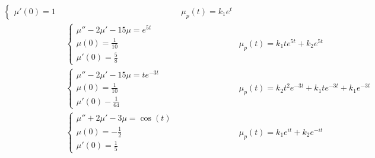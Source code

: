\begin{enumerate}
\begin{align*}
\begin{cases}
			      \mu ' \left(0\right) = 1
		      \end{cases}
		       &                                                     &
		      \mu_p \left(t\right) = k_1 e^{t}                                                                                                        \\
		       &
		      \begin{cases}
			      \mu '' - 2 \mu ' - 15 \mu = e^{5t } \\
			      \mu \left(0\right) = \frac{1}{10}   \\
			      \mu ' \left(0\right) = \frac{5}{8}
		      \end{cases}
		       &                                                     & \mu _p \left(t\right) = k_1 t e ^{5t } + k_2 e ^{ 5t }                         \\
		       &
		      \begin{cases}
			      \mu '' - 2 \mu ' - 15 \mu  = t e ^{ - 3t } \\
			      \mu \left(0\right) = \frac{1}{10}          \\
			      \mu ' \left(0\right) - \frac{1}{64}
		      \end{cases}
		       &                                                     & \mu_p \left(t\right) = k_2 t^2  e ^{ -3t } + k_1 t e ^{ -3t } + k_1 e ^{ -3t } \\
		       & \begin{cases}
			         \mu '' + 2 \mu ' - 3 \mu  = \cos \left(t\right) \\
			         \mu \left(0\right) = - \frac{1}{2}              \\
			         \mu ' \left(0\right) = \frac{1}{5}
		         \end{cases}
		       &                                                     & \mu _p\left(t\right) = k_1 e^{it} + k_2 e ^{ -it}
	      \end{align*}
\end{enumerate}


